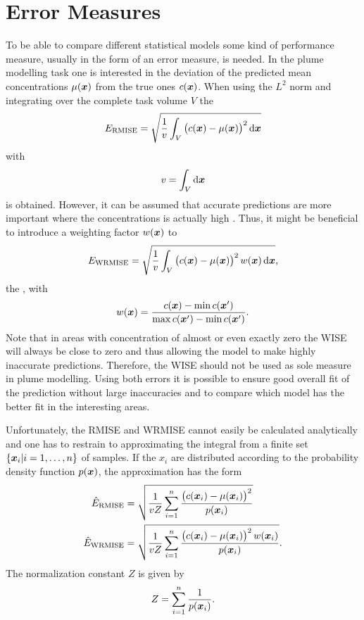 \chapter{Error Measures}\label{sec:error}
To be able to compare different statistical models some kind of performance 
measure, usually in the form of an error measure, is needed. In the plume 
modelling task one is interested in the deviation of the predicted mean 
concentrations $\mu(\bm{x})$ from the true ones $c(\bm{x})$. When using the $L^2$ 
norm and integrating over the complete task volume $V$ the 
\begin{equation}
    E\ped{RMISE} = \sqrt{\frac{1}{v} \int_V \del{c(\vc x) - \mu(\vc x)}^2 
        \dif\vc x}
\end{equation}
with
\begin{equation}
    v = \int_V \dif\vc x
\end{equation}
is obtained. However, it can be assumed that accurate predictions are more 
important where the concentrations is actually high 
\parencite[c.p.][]{Marchant:2012wb}. Thus, it might be beneficial to introduce 
a weighting factor $w(\bm{x})$ to
\begin{equation}
    E\ped{WRMISE} = \sqrt{\frac{1}{v} \int_V \del{c(\vc x) - \mu(\vc x)}^2 w(\vc 
        x) \dif\vc x} \text{,}
\end{equation}
the , with
\begin{equation}
    w(\bm{x}) = \frac{c(\bm{x}) - \min c(\bm{x}')}{\max c(\bm{x}') - \min c(\bm{x}')} 
    \text{.}
\end{equation}
Note that in areas with concentration of almost or even exactly zero the WISE 
will always be close to zero and thus allowing the model to make highly 
inaccurate predictions. Therefore, the WISE should not be used as sole measure 
in plume modelling. Using both errors it is possible to ensure good overall fit 
of the prediction without large inaccuracies and to compare which model has the 
better fit in the interesting areas.

Unfortunately, the RMISE and WRMISE cannot easily be calculated analytically and 
one has to restrain to approximating the integral from a finite set $\{\bm{x}_i 
| i = 1, \dots, n\}$ of samples. If the $x_i$ are distributed according to the 
probability density function $p(\bm{x})$, the approximation has the form
\begin{align}
    \hat E\ped{RMISE} &= \sqrt{\frac{1}{vZ} \sum_{i=1}^n \frac{\del{c(\vc x_i) 
                - \mu(\vc x_i)}^2}{p(\vc x_i)}} \\
    \hat E\ped{WRMISE} &= \sqrt{\frac{1}{vZ} \sum_{i=1}^n \frac{\del{c(\vc x_i) 
                - \mu(\vc x_i)}^2 w(\vc x_i)}{p(\vc x_i)}} \text{.}
\end{align}
The normalization constant $Z$ is given by
\begin{equation}
    Z = \sum_{i=1}^n \frac{1}{p(\bm{x}_i)} \text{.}
\end{equation}

